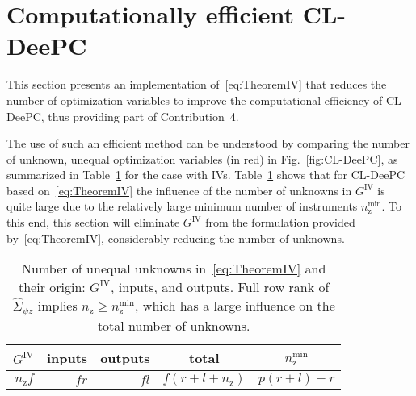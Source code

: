 \section{Computationally efficient \acs{CL-DeePC}}\label{sec:Sequential}
\noindent This section presents an implementation of~\eqref{eq:TheoremIV} that reduces the number of optimization variables to improve the computational efficiency of \ac{CL-DeePC}, thus providing part of Contribution~4.
%

The use of such an efficient method can be understood by comparing the number of unknown, unequal optimization variables (in red) in Fig.~\ref{fig:CL-DeePC}, as summarized in Table~\ref{tab:unknowns} for the case with \ac{IVs}. Table~\ref{tab:unknowns} shows that for \ac{CL-DeePC} based on~\eqref{eq:TheoremIV} the influence of the number of unknowns in $G^\mathrm{IV}$ is quite large due to the relatively large minimum number of instruments $n_\mathrm{z}^\mathrm{min}$. To this end, this section will eliminate $G^\mathrm{IV}$ from the formulation provided by~\eqref{eq:TheoremIV}, considerably reducing the number of unknowns.

\begin{table}[t!]
    \centering
    \begin{tabular}{rrrcc}
        $G^\mathrm{IV}$ & inputs & outputs & total & $n_\mathrm{z}^\mathrm{min}$\\\hline
        $n_\mathrm{z}f$ & $fr$ & $fl$ & $f(r+l+n_\mathrm{z})$ & $p(r+l)+r$\\
    \end{tabular}
    \caption{Number of unequal unknowns in~\eqref{eq:TheoremIV} and their origin: $G^\mathrm{IV}$, inputs, and outputs. Full row rank of $\hat{\Sigma}_{\psi z}$ implies $n_\mathrm{z}\geq n_\mathrm{z}^\mathrm{min}$, which has a large influence on the total number of unknowns.}
    \label{tab:unknowns}
\end{table}

